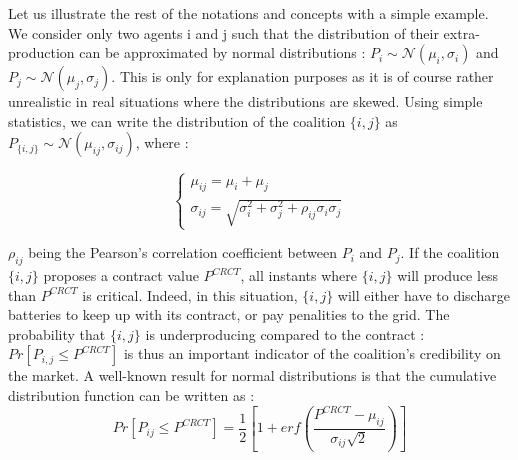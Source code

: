 \documentclass[conference]{IEEEtran}
\begin{document}
Let us illustrate the rest of the notations and concepts with a simple example. We consider only two agents i and j such that the distribution of their extra-production can be approximated by normal distributions : $ P_{i} \sim \mathcal{N}(\mu_{i}, \sigma_{i} ) $ and $ P_{j} \sim \mathcal{N}(\mu_{j}, \sigma_{j} ) $. This is only for explanation purposes as it is of course rather unrealistic in real situations where the distributions are skewed. Using simple statistics, we can write the distribution of the coalition $ \{i,j\} $ as $ P_{\{i,j\}} \sim \mathcal{N}(\mu_{ij}, \sigma_{ij}) $, where :

\begin{equation}
\left\{ \begin{array}{lll}
		\mu_{ij} = \mu_{i} + \mu_{j} \\
		\sigma_{ij} = \sqrt{\sigma_{i}^{2} + \sigma_{j}^{2} + \rho_{ij} \sigma_{i} \sigma_{j} }
\end{array} \right.
\end{equation}

$ \rho_{ij} $ being the Pearson's correlation coefficient between $ P_{i} $ and $ P_{j} $. If the coalition $ \{i,j\}$ proposes a contract value $ P^{CRCT} $, all instants where $ \{i,j\}$ will produce less than $ P^{CRCT} $ is critical. Indeed, in this situation, $ \{i,j\}$ will either have to discharge batteries to keep up with its contract, or pay penalities to the grid. The probability that $ \{i,j\}$ is underproducing compared to the contract : $ Pr[P_{i,j} \leq P^{CRCT}] $ is thus an important indicator of the coalition's credibility on the market. A well-known result for normal distributions is that the cumulative distribution function can be written as :
\begin{equation}
Pr[P_{ij} \leq P^{CRCT}] = \dfrac{1}{2} \left[ 1+ erf \left( \dfrac{P^{CRCT} - \mu_{ij}}{\sigma_{ij}\sqrt{2}} \right) \right] 
\end{equation}
\end{document}
